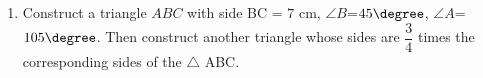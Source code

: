 \begin{enumerate}
\item Construct a triangle $ABC$ with side BC = $7$ cm, $\angle{B}$=$45\degree$, $\angle{A}$=$105\degree$. Then construct another triangle whose sides are  $\dfrac{3}{4}$  times the corresponding sides of the $\triangle$ ABC.
\end{enumerate}
